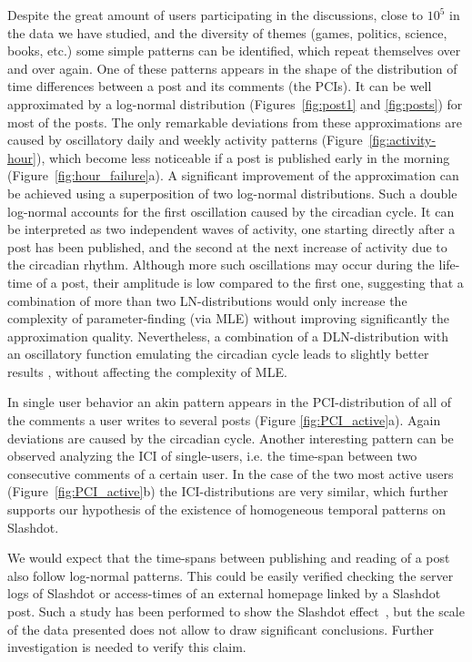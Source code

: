 \documentclass[twoside,11pt]{article}
\begin{document}
Despite the great amount of users participating in the discussions,
close to $10^5$ in the data we have studied, and the diversity of
themes (games, politics, science, books, etc.) some simple patterns
can be identified, which repeat themselves over and over again. One of
these patterns appears in the shape of the distribution of time
differences between a post and its comments (the PCIs). It can be well
approximated by a log-normal distribution (Figures~\ref{fig:post1} and
\ref{fig:posts}) for most of the posts. The only remarkable deviations
from these approximations are caused by oscillatory daily and weekly
activity patterns (Figure~\ref{fig:activity-hour}), which become less
noticeable if a post is published early in the morning
(Figure~\ref{fig:hour_failure}a). A significant improvement of the
approximation can be achieved using a superposition of two log-normal
distributions. Such a double log-normal accounts for the first
oscillation caused by the circadian cycle.  It can be interpreted as
two independent waves of activity, one starting directly after a post
has been published, and the second at the next increase of activity
due to the circadian rhythm. Although more such oscillations may occur
during the life-time of a post, their amplitude is low compared to the
first one, suggesting that a combination of more than two
LN-distributions would only increase the complexity of
parameter-finding (via MLE) without improving significantly the
approximation quality.  Nevertheless, a combination of a
DLN-distribution with an oscillatory function emulating the circadian
cycle leads to slightly better results \citep{kaltenbrunner_LAWEB2007},
without affecting the complexity of MLE.

In single user behavior an akin pattern appears in the
PCI-distribution of all of the comments a user writes to several posts
(Figure \ref{fig:PCI_active}a). Again deviations are caused by the
circadian cycle.  Another interesting pattern can be observed
analyzing the ICI of single-users, i.e. the time-span between two
consecutive comments of a certain user.  In the case of the two most
active users (Figure~\ref{fig:PCI_active}b) the ICI-distributions are
very similar, which further supports our hypothesis of the existence
of homogeneous temporal patterns on Slashdot.

We would expect that the time-spans between publishing and reading of
a post also follow log-normal patterns. This could be easily verified
checking the server logs of Slashdot or access-times of an external
homepage linked by a Slashdot post.  Such a study has been performed
to show the Slashdot effect~\citep{Adler1999}, but the scale of the
data presented does not allow to draw significant conclusions. Further
investigation is needed to verify this claim.
\end{document}

